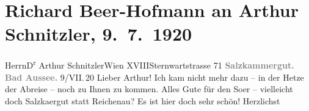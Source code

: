 

         \renewcommand{\erwaehnteOrte}{Orte: Bad Aussee, Reichenau an der Rax, Salzkammergut, Sternwartestraße, Wien, XVIII., Währing}
         \renewcommand{\erwaehnteWerke}{}
               \section[Richard Beer-Hofmann an Arthur Schnitzler, 9. 7. 1920]{ Richard Beer-Hofmann an Arthur Schnitzler, 9. 7. 1920}\nopagebreak{}\rehead{ }\begin{ledgroupsized}[t]{13cm}\normalsize\beginnumbering \toendnotes[C]{\smallbreak\pagebreak[2]} 
\toendnotes[C]{\smallbreak}\pstart{}{\pb}Herrn\pend{}\pstart{}D\textsuperscript{r} Arthur Schnitzler\pend{}\pstart{}Wien XVIII\pend{}\pstart{}Sternwartstrasse 71\pend{}{\bigskip}\pstart
           \noindent{}\centering{}{\pb}\textcolor{gray}{\textbf{Salzkammergut. Bad Aussee.}}\pend
           \pstart
           \centering{}{\pb}9/VII. 20\pend
           \pstart
           Lieber Arthur! Ich kam nicht mehr dazu – in der Hetze der Abreise –
               noch zu Ihnen zu kommen. Alles Gute für den So{\geminationm}er –
               vielleicht doch Salzka{\geminationm}ergut statt Reichenau? Es ist hier doch
               sehr schön! Herzlichst\pend
           \pstart \label{TLL02346_AS-1v}\label{TLL02346_AS-1h}\pend{}
         
         \endnumbering{}\end{ledgroupsized}  \newcommand{\dateiname}{L02346}\newcommand{\titel}{Richard Beer-Hofmann an Arthur Schnitzler, 9. 7. 1920}\newcommand{\editorInnen}{Martin Anton Müller und Gerd-Hermann Susen}
      